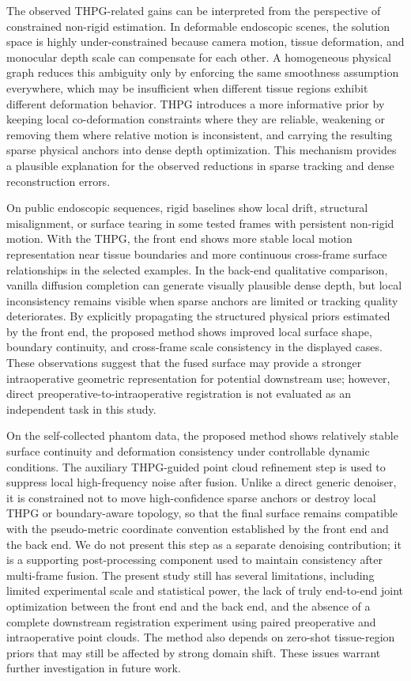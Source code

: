 \documentclass[pdflatex,sn-mathphys-num]{sn-jnl}
\begin{document}
The observed THPG-related gains can be interpreted from the perspective of constrained non-rigid estimation. In deformable endoscopic scenes, the solution space is highly under-constrained because camera motion, tissue deformation, and monocular depth scale can compensate for each other. A homogeneous physical graph reduces this ambiguity only by enforcing the same smoothness assumption everywhere, which may be insufficient when different tissue regions exhibit different deformation behavior. THPG introduces a more informative prior by keeping local co-deformation constraints where they are reliable, weakening or removing them where relative motion is inconsistent, and carrying the resulting sparse physical anchors into dense depth optimization. This mechanism provides a plausible explanation for the observed reductions in sparse tracking and dense reconstruction errors.

On public endoscopic sequences, rigid baselines show local drift, structural misalignment, or surface tearing in some tested frames with persistent non-rigid motion. With the THPG, the front end shows more stable local motion representation near tissue boundaries and more continuous cross-frame surface relationships in the selected examples. In the back-end qualitative comparison, vanilla diffusion completion can generate visually plausible dense depth, but local inconsistency remains visible when sparse anchors are limited or tracking quality deteriorates. By explicitly propagating the structured physical priors estimated by the front end, the proposed method shows improved local surface shape, boundary continuity, and cross-frame scale consistency in the displayed cases. These observations suggest that the fused surface may provide a stronger intraoperative geometric representation for potential downstream use; however, direct preoperative-to-intraoperative registration is not evaluated as an independent task in this study.

On the self-collected phantom data, the proposed method shows relatively stable surface continuity and deformation consistency under controllable dynamic conditions. The auxiliary THPG-guided point cloud refinement step is used to suppress local high-frequency noise after fusion. Unlike a direct generic denoiser, it is constrained not to move high-confidence sparse anchors or destroy local THPG or boundary-aware topology, so that the final surface remains compatible with the pseudo-metric coordinate convention established by the front end and the back end. We do not present this step as a separate denoising contribution; it is a supporting post-processing component used to maintain consistency after multi-frame fusion. The present study still has several limitations, including limited experimental scale and statistical power, the lack of truly end-to-end joint optimization between the front end and the back end, and the absence of a complete downstream registration experiment using paired preoperative and intraoperative point clouds. The method also depends on zero-shot tissue-region priors that may still be affected by strong domain shift. These issues warrant further investigation in future work.
\end{document}
